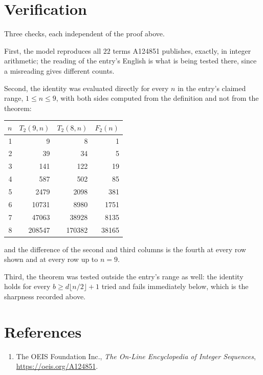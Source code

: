 \documentclass[11pt,a4paper]{article}
\theoremstyle{plain}
\theoremstyle{definition}
\begin{document}
\section{Verification}

Three checks, each independent of the proof above.

First, the model reproduces all $22$ terms A124851 publishes, exactly, in integer
arithmetic; the reading of the entry's English is what is being tested there, since a
misreading gives different counts.

Second, the identity was evaluated directly for every $n$ in the entry's claimed range,
$1\le n\le9$, with both sides computed from the definition and not from the theorem:

\begin{center}
\begin{tabular}{rrrr}
$n$ & $T_{2}(9,n)$ & $T_{2}(8,n)$ & $F_{2}(n)$ \\ \hline
1 & 9 & 8 & 1 \\
2 & 39 & 34 & 5 \\
3 & 141 & 122 & 19 \\
4 & 587 & 502 & 85 \\
5 & 2479 & 2098 & 381 \\
6 & 10731 & 8980 & 1751 \\
7 & 47063 & 38928 & 8135 \\
8 & 208547 & 170382 & 38165 \\
\end{tabular}
\end{center}

\noindent and the difference of the second and third columns is the fourth at every row shown
and at every row up to $n=9$.

Third, the theorem was tested outside the entry's range as well: the identity holds for every
$b\ge d\lfloor n/2\rfloor+1$ tried and fails immediately below, which is the sharpness recorded
above.

\section*{References}
\begin{enumerate}
\item The OEIS Foundation Inc., \emph{The On-Line Encyclopedia of Integer Sequences},
\url{https://oeis.org/A124851}.
\end{enumerate}
\end{document}
